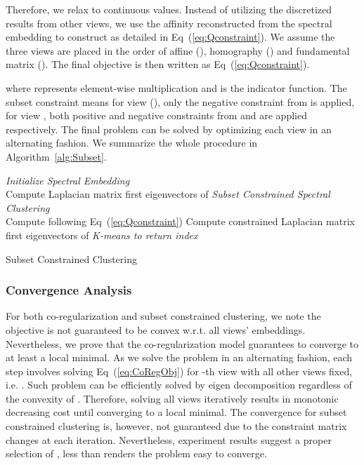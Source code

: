 \documentclass[10pt,twocolumn,letterpaper]{article}
\begin{document}
Therefore, we relax  to continuous values. Instead of utilizing the discretized results from other views, we use the affinity reconstructed from the spectral embedding  to construct  as detailed in Eq~(\ref{eq:Qconstraint}). We assume the three views are placed in the order of affine (), homography () and fundamental matrix (). The final objective is then written as Eq~(\ref{eq:Qconstraint}).

\vspace{-0.2cm}

\noindent
where  represents element-wise multiplication and  is the indicator function. The subset constraint means for view  (), only the negative constraint from  is applied, for view , both positive and negative constraints from  and  are applied respectively.  The final problem can be solved by optimizing each view  in an alternating fashion. We summarize the whole procedure in Algorithm~\ref{alg:Subset}.

\IncMargin{1em}
\begin{algorithm}
\emph{Initialize Spectral Embedding}\\
\For{ \KwTo }
{
	Compute Laplacian matrix \;
	 first  eigenvectors of \;
}
\emph{Subset Constrained Spectral Clustering}\\
{
\For{ \KwTo }
{
	Compute  following Eq~(\ref{eq:Qconstraint})\;
	Compute constrained Laplacian matrix \;
	 first  eigenvectors of \;
}}
\emph{K-means to return index}\\
{ \Concatenate{} 
}\;
 \Kmeans{,}
\caption{\small{Subset Constrained Clustering}\label{alg:Subset}}
\end{algorithm}
\DecMargin{1em}

\subsubsection{Convergence Analysis}

For both co-regularization and subset constrained clustering, we note the objective is not guaranteed to be convex w.r.t. all views' embeddings. Nevertheless, we prove that the co-regularization model guarantees to converge to at least a local minimal. As we solve the problem in an alternating fashion, each step involves solving Eq~(\ref{eq:CoRegObj}) for -th view with all other views fixed, i.e. . Such problem can be efficiently solved by eigen decomposition regardless of the convexity of . Therefore, solving all views iteratively results in monotonic decreasing cost until converging to a local minimal. The convergence for subset constrained clustering is, however, not guaranteed due to the constraint matrix  changes at each iteration. Nevertheless, experiment results suggest a proper selection of , less than  renders the problem easy to converge.
\end{document}
